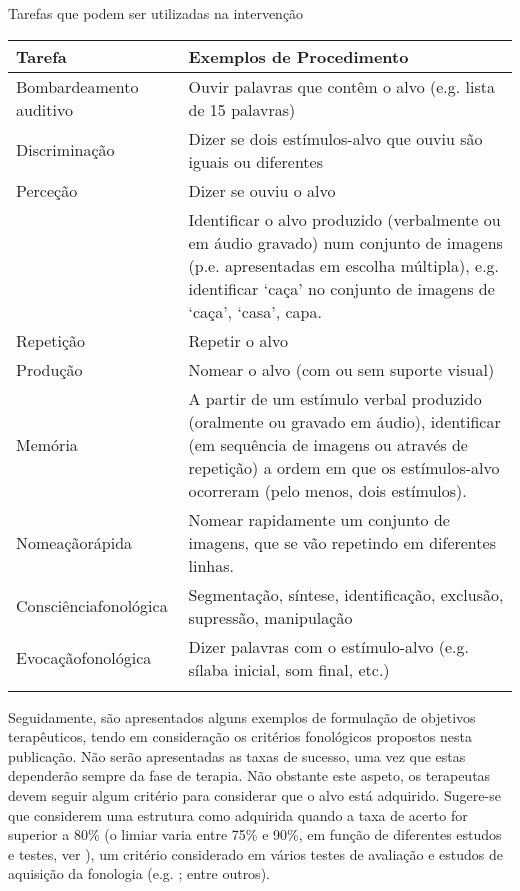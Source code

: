 \documentclass[output=paper,colorlinks,citecolor=brown,booklanguage=portuguese]{langscibook}
\begin{document}
\begin{Tabela}[t]
\caption{Tarefas que podem ser utilizadas na intervenção}
\label{tab:cap7tab1}
\begin{tabularx}{\textwidth}{p{3cm}Q}
\lsptoprule
\textbf{Tarefa} &  \textbf{Exemplos de Procedimento}\\
\midrule
Bombardeamento auditivo & Ouvir palavras que contêm o alvo (e.g. lista de 15 palavras) \\
\tablevspace
Discriminação & Dizer se dois estímulos-alvo que ouviu são iguais ou diferentes \\
\tablevspace
Perceção & Dizer se ouviu o alvo\\
 & Identificar o alvo produzido (verbalmente ou em áudio gravado) num conjunto de imagens (p.e. apresentadas em escolha múltipla), e.g. identificar ‘caça’ no conjunto de imagens de ‘caça’, ‘casa’, capa. \\
 \tablevspace
Repetição & Repetir o alvo \\
\tablevspace
Produção & Nomear o alvo (com ou sem suporte visual) \\
\tablevspace
Memória & A partir de um estímulo verbal produzido (oralmente ou gravado em áudio), identificar (em sequência de imagens ou através de repetição) a ordem em que os estímulos-alvo ocorreram (pelo menos, dois estímulos). \\
\tablevspace
Nomeação\newline rápida & Nomear rapidamente um conjunto de imagens, que se vão repetindo em diferentes linhas. \\
\tablevspace
Consciência\newline fonológica & Segmentação, síntese, identificação, exclusão, supressão, manipulação \\
\tablevspace
Evocação\newline fonoló\-gica & Dizer palavras com o estímulo-alvo (e.g. sílaba inicial, som final, etc.) \\
\lspbottomrule
\end{tabularx}
\end{Tabela}


Seguidamente, são apresentados alguns exemplos de formulação de objetivos terapêuticos, tendo em consideração os critérios fonológicos propostos nesta publicação. Não serão apresentadas as taxas de sucesso, uma vez que estas dependerão sempre da fase de terapia. Não obstante este aspeto, os terapeutas devem seguir algum critério para considerar que o alvo está adquirido. Sugere-se que considerem uma estrutura como adquirida quando a taxa de acerto for superior a 80\% (o limiar varia entre 75\% e 90\%, em função de diferentes estudos e testes, ver ), um critério considerado em vários testes de avaliação e estudos de aquisição da fonologia (e.g. \citealp{Yavas2001, Mendes2013, Ramalho2017, Reis2018}; entre outros).
\end{document}
